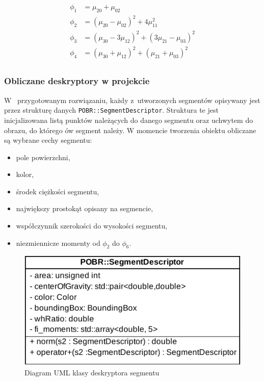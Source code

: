 \begin{equation}
    \begin{aligned}
        \phi_{1} &= \mu_ {20} + \mu_{02} \\
        \phi_{2} &= (\mu_{20} - \mu_{02})^2 + 4\mu^2_{11} \\
        \phi_{3} &= (\mu_{30} - 3\mu_{12})^2 + (3\mu_{21} - \mu_{03})^2 \\
        \phi_{4} &= (\mu_{30} + \mu_{12})^2 + (\mu_{21} + \mu_{03})^2 \\
    \end{aligned}
    \label{eqn:hu-moments}
\end{equation}

\subsubsection{Obliczane deskryptory w projekcie}
W~ przygotowanym rozwiązaniu, każdy z~utworzonych segmentów opisywany jest przez strukturę danych \texttt{POBR::SegmentDescriptor}. Struktura te jest inicjalizowana listą punktów należących do danego segmentu oraz uchwytem do obrazu, do którego ów segment należy. W momencie tworzenia obiektu obliczane są wybrane cechy segmentu:

\begin{itemize}
    \item pole powierzchni,
    \item kolor,
    \item środek ciężkości segmentu,
    \item największy prostokąt opisany na segmencie,
    \item współczynnik szerokości do wysokości segmentu,
    \item niezmiennicze momenty od $\phi_{2}$ do $\phi_{6}$.
\end{itemize}


\begin{figure}[h]
    \centering
    \includegraphics[width=\columnwidth]{figures/POBR-Class.pdf}
    \caption{Diagram UML klasy deskryptora segmentu}
    \label{fig:descriptor-uml}
\end{figure}

